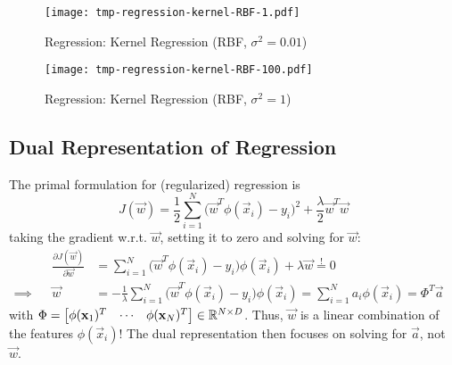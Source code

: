 			\begin{figure}
				\centering
				\texttt{[image: tmp-regression-kernel-RBF-1.pdf]}
				\caption{Regression: Kernel Regression (RBF, \( \sigma^2 = 0.01 \))}
				\label{fig:regressionKernelA}
			\end{figure}
			\begin{figure}
				\centering
				\texttt{[image: tmp-regression-kernel-RBF-100.pdf]}
				\caption{Regression: Kernel Regression (RBF, \( \sigma^2 = 1 \))}
				\label{fig:regressionKernelB}
			\end{figure}

		\subsection{Dual Representation of Regression}
			The primal formulation for (regularized) regression is
			\begin{equation}
				J(\vec{w}) = \frac{1}{2} \sum_{i = 1}^{N} \big( \vec{w}^T \phi(\vec{x}_i) - y_i \big)^2 + \frac{\lambda}{2} \vec{w}^T \vec{w}
			\end{equation}
			taking the gradient w.r.t. \( \vec{w} \), setting it to zero and solving for \(\vec{w}\):
			\begin{align}
				&& \frac{\partial J(\vec{w})}{\partial \vec{w}} &= \sum_{i = 1}^{N} \big(\vec{w}^T \phi(\vec{x}_i) - y_i\big) \phi(\vec{x}_i) + \lambda \vec{w} \overset{!}{=} 0 & \\
				\implies && \vec{w} &= -\frac{1}{\lambda} \sum_{i = 1}^{N} \big( \vec{w}^T \phi(\vec{x}_i) - y_i \big) \phi(\vec{x}_i) = \sum_{i = 1}^{N} a_i \phi(\vec{x}_i) = \Phi^T \vec{a}
			\end{align}
			with \( \Phi = \begin{bmatrix} \phi(\boldsymbol{\mathrm{x}}_1)^T & \cdots & \phi(\boldsymbol{\mathrm{x}}_N)^T \end{bmatrix} \in \mathbb{R}^{N \times D} \). Thus, \(\vec{w}\) is a linear combination of the features \(\phi(\vec{x}_i)\)! The dual representation then focuses on solving for \(\vec{a}\), not \(\vec{w}\).
			
